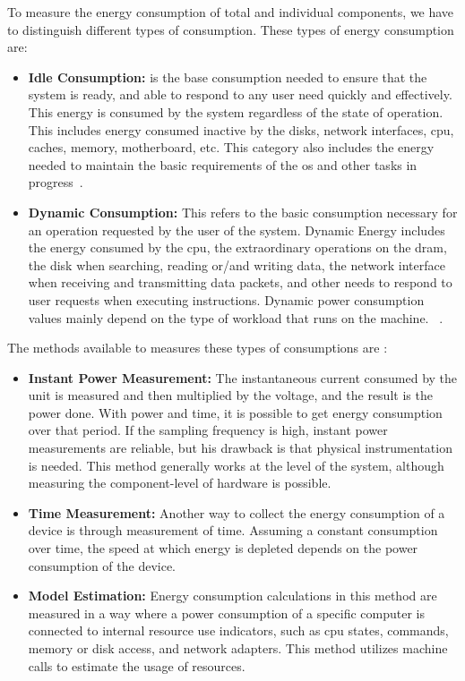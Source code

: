 


To measure the energy consumption of total and individual components, we have to distinguish different types of consumption.  These types of energy consumption are:

\begin{itemize}
    \item \textbf{Idle Consumption:} is the base consumption needed to ensure that the system is ready, and able to respond to any user need quickly and effectively. This energy is consumed by the system regardless of the state of operation. This includes energy consumed inactive by the disks, network interfaces, \gls{cpu}, caches, memory, motherboard, etc. This category also includes the energy needed to maintain the basic requirements of the \gls{os} and other tasks in progress~\cite{portela2016}.
    
   \item \textbf{Dynamic Consumption:} This refers to the basic consumption necessary for an operation requested by the user of the system. Dynamic Energy includes the energy consumed by the \gls{cpu}, the extraordinary operations on the \gls{dram}, the disk when searching, reading or/and writing data, the network interface when receiving and transmitting data packets, and other needs to respond to user requests when executing instructions. Dynamic power consumption values mainly depend on the type of workload that runs on the machine. ~\cite{portela2016}.
  \end{itemize}
  


The methods available to measures these types of consumptions are \cite{ardito2019methodological}:

\begin{itemize}
    \item \textbf{Instant Power Measurement:} The instantaneous current consumed by the unit is measured and then multiplied by the voltage, and the result is the power done.
    With power and time, it is possible to get energy consumption over that period. If the sampling frequency is high, instant power measurements are reliable, but his drawback is that physical instrumentation is needed.  This method generally works at the level of the system, although measuring the component-level of hardware is possible.
    
    \item \textbf{Time Measurement:} Another way to collect the energy consumption of a device is through measurement of time. Assuming a constant consumption over time, the speed at which energy is depleted depends on the power consumption of the device. 
    \item \textbf{Model Estimation:} Energy consumption calculations in this method are measured in a way where a power consumption of a specific computer is connected to internal resource use indicators, such as \gls{cpu} states, commands, memory or disk access, and network adapters. This method utilizes machine calls to estimate the usage of resources.
\end{itemize}


